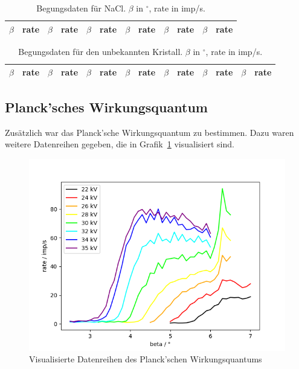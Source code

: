 \documentclass{article}
\begin{document}
\newpage
\begin{table}[H]
\caption{Begungsdaten für NaCl. $\beta$ in $^\circ$, rate in imp/s.}
\small
\begin{tabular}{rr|rr|rr|rr|rr|rr}
$\beta$ & rate & $\beta$ & rate & $\beta$ & rate & $\beta$ & rate & $\beta$ & rate & $\beta$ & rate \\
\hline

\end{tabular}
\label{tab:nacl}
\end{table}

\newpage

\begin{table}[H]
\caption{Begungsdaten für den unbekannten Kristall. $\beta$ in $^\circ$, rate in imp/s.}
\small
\begin{tabular}{rr|rr|rr|rr|rr|rr|rr}
$\beta$ & rate & $\beta$ & rate & $\beta$ & rate & $\beta$ & rate & $\beta$ & rate & $\beta$ & rate & $\beta$ & rate \\
\hline

\end{tabular}
\label{tab:kristall}
\end{table}

\subsection{Planck'sches Wirkungsquantum}


Zusätzlich war das Planck'sche Wirkungsquantum zu bestimmen. Dazu waren weitere Datenreihen gegeben, die in Grafik~\ref{fig:planck} visualisiert sind.

\begin{figure}[H]
\includegraphics[scale=0.9]{planck.png}
\caption{Visualisierte Datenreihen des Planck'schen Wirkungsquantums}
\label{fig:planck}
\end{figure}
\end{document}

